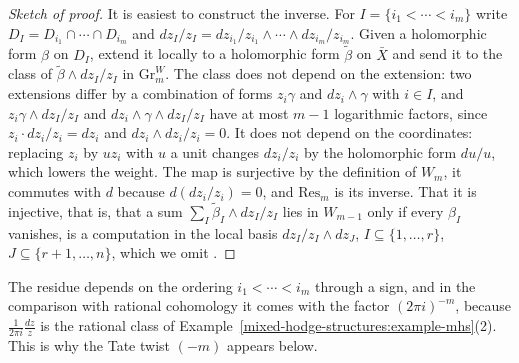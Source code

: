 \begin{proof}[Sketch of proof]
It is easiest to construct the inverse. For $I = \{i_1 < \cdots < i_m\}$ write $D_I = D_{i_1} \cap \cdots \cap D_{i_m}$ and $dz_I/z_I = dz_{i_1}/z_{i_1} \wedge \cdots \wedge dz_{i_m}/z_{i_m}$. Given a
holomorphic form $\beta$ on $D_I$, extend it locally to a holomorphic form $\tilde\beta$ on $\bar X$ and send it to the class of $\tilde\beta \wedge dz_I/z_I$ in $\mathrm{Gr}^W_m$. The class does not depend on the
extension: two extensions differ by a combination of forms $z_i\gamma$ and $dz_i \wedge \gamma$ with $i \in I$, and $z_i\gamma \wedge dz_I/z_I$ and $dz_i \wedge \gamma \wedge dz_I/z_I$ have at most $m - 1$
logarithmic factors, since $z_i \cdot dz_i/z_i = dz_i$ and $dz_i \wedge dz_i/z_i = 0$. It does not depend on the coordinates: replacing $z_i$ by $uz_i$ with $u$ a unit changes $dz_i/z_i$ by the holomorphic
form $du/u$, which lowers the weight. The map is surjective by the definition of $W_m$, it commutes with $d$ because $d(dz_i/z_i) = 0$, and $\mathrm{Res}_m$ is its inverse. That it is injective, that is,
that a sum $\sum_I\tilde\beta_I \wedge dz_I/z_I$ lies in $W_{m-1}$ only if every $\beta_I$ vanishes, is a computation in the local basis $dz_I/z_I \wedge dz_J$, $I \subseteq \{1, \ldots, r\}$,
$J \subseteq \{r+1, \ldots, n\}$, which we omit \cite{deligne-hodge-2}.
\end{proof}

The residue depends on the ordering $i_1 < \cdots < i_m$ through a sign, and in the comparison with rational cohomology it comes with the factor $(2\pi i)^{-m}$, because $\frac{1}{2\pi i}\frac{dz}{z}$ is the
rational class of Example~\ref{mixed-hodge-structures:example-mhs}(2). This is why the Tate twist $(-m)$ appears below.

